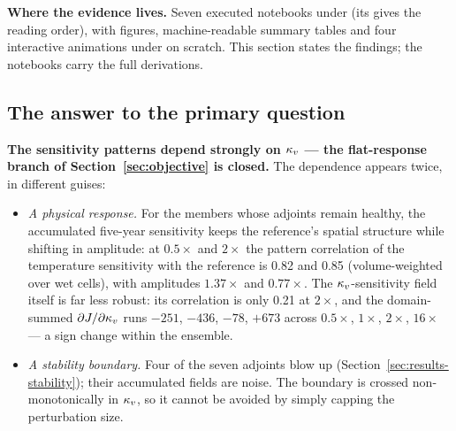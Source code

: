 \begin{callout}
\textbf{Where the evidence lives.} Seven executed notebooks under
\allowbreak{}
(its  gives the reading order), with figures, machine-readable
summary tables and four interactive animations under
 on scratch. This section states the
findings; the notebooks carry the full derivations.
\end{callout}

\subsection{The answer to the primary question}
\label{sec:results-answer}

\textbf{The sensitivity patterns depend strongly on $\kappa_{v}$ --- the flat-response
branch of Section~\ref{sec:objective} is closed.} The dependence appears twice,
in different guises:

\begin{itemize}[nosep]
  \item \emph{A physical response.} For the members whose adjoints remain
        healthy, the accumulated five-year sensitivity keeps the reference's
        spatial structure while shifting in amplitude: at $0.5\times$ and
        $2\times$ the pattern correlation of the temperature sensitivity with
        the reference is 0.82 and 0.85 (volume-weighted over wet cells), with
        amplitudes $1.37\times$ and $0.77\times$. The $\kappa_{v}$-sensitivity field
        itself is far less robust: its correlation is only 0.21 at $2\times$,
        and the domain-summed $\partial J/\partial\kappa_{v}$ runs $-251$, $-436$,
        $-78$, $+673$ across $0.5\times$, $1\times$, $2\times$, $16\times$ ---
        a sign change within the ensemble.
  \item \emph{A stability boundary.} Four of the seven adjoints blow up
        (Section~\ref{sec:results-stability}); their accumulated fields are
        noise. The boundary is crossed non-monotonically in $\kappa_{v}$, so it cannot
        be avoided by simply capping the perturbation size.
\end{itemize}

